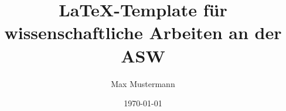 
\newcommand{\asw}{ASW}

\newcommand{\paragraphheader}[1]{\paragraph{#1}\mbox{}\\}

\newcommand{\vgl}[2]{\footcite[Vgl.][#2]{#1}}
\newcommand{\footrefnote}[2]{\footnote{Für das Thema #1 siehe Kapitel~\ref{#2}}}
\newcommand{\wholesection}[2]{\footcite[Für den gesamten Abschnitt vgl.][#2]{#1}}

\usepackage{lipsum}


\title{\LaTeX-Template für wissenschaftliche Arbeiten an der \asw}
\author{Max Mustermann}
\date{\today}

\newcommand{\varMartrikelnummer}{XXXXXXX}
\newcommand{\varArbeit}{Bachelorarbeit}
\newcommand{\varStudiengang}{Wirtschaftsinformatik}
\newcommand{\varUnternehmen}{Dummy Company}
\newcommand{\varBetrBetreuer}{Erika Musterfrau}
\newcommand{\varASWGutachter}{Prof. Dr. Dieter Hofbauer}
\newcommand{\varEingereichtAm}{01. Januar 2020}



